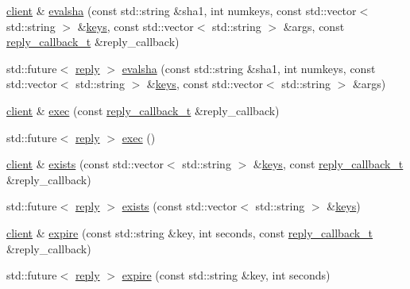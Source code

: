 \begin{DoxyCompactItemize}
\item 
\hyperlink{classcpp__redis_1_1client}{client} \& \hyperlink{classcpp__redis_1_1client_a71cd73130b4755c9f4da3b602b09a1be}{evalsha} (const std\+::string \&sha1, int numkeys, const std\+::vector$<$ std\+::string $>$ \&\hyperlink{classcpp__redis_1_1client_acb7845a206b2321e6919c2f38282c322}{keys}, const std\+::vector$<$ std\+::string $>$ \&args, const \hyperlink{classcpp__redis_1_1client_a061a1140d36d2eaeda82b09a0bb3f9f2}{reply\+\_\+callback\+\_\+t} \&reply\+\_\+callback)
\item 
std\+::future$<$ \hyperlink{classcpp__redis_1_1reply}{reply} $>$ \hyperlink{classcpp__redis_1_1client_a3ab7684f292037dc3918c32549b7ad53}{evalsha} (const std\+::string \&sha1, int numkeys, const std\+::vector$<$ std\+::string $>$ \&\hyperlink{classcpp__redis_1_1client_acb7845a206b2321e6919c2f38282c322}{keys}, const std\+::vector$<$ std\+::string $>$ \&args)
\item 
\hyperlink{classcpp__redis_1_1client}{client} \& \hyperlink{classcpp__redis_1_1client_a76e78829c4ee2e1484268e465fab8997}{exec} (const \hyperlink{classcpp__redis_1_1client_a061a1140d36d2eaeda82b09a0bb3f9f2}{reply\+\_\+callback\+\_\+t} \&reply\+\_\+callback)
\item 
std\+::future$<$ \hyperlink{classcpp__redis_1_1reply}{reply} $>$ \hyperlink{classcpp__redis_1_1client_a93c5b232ae13b5107b6aa1ea5f70b70d}{exec} ()
\item 
\hyperlink{classcpp__redis_1_1client}{client} \& \hyperlink{classcpp__redis_1_1client_a11836c341d54a9d767cd37508bf87d73}{exists} (const std\+::vector$<$ std\+::string $>$ \&\hyperlink{classcpp__redis_1_1client_acb7845a206b2321e6919c2f38282c322}{keys}, const \hyperlink{classcpp__redis_1_1client_a061a1140d36d2eaeda82b09a0bb3f9f2}{reply\+\_\+callback\+\_\+t} \&reply\+\_\+callback)
\item 
std\+::future$<$ \hyperlink{classcpp__redis_1_1reply}{reply} $>$ \hyperlink{classcpp__redis_1_1client_a16ab72e15bd14a3fd2eb97194cea3d2d}{exists} (const std\+::vector$<$ std\+::string $>$ \&\hyperlink{classcpp__redis_1_1client_acb7845a206b2321e6919c2f38282c322}{keys})
\item 
\hyperlink{classcpp__redis_1_1client}{client} \& \hyperlink{classcpp__redis_1_1client_ab2c50e9f37a4e6a5dff059c991dbd15e}{expire} (const std\+::string \&key, int seconds, const \hyperlink{classcpp__redis_1_1client_a061a1140d36d2eaeda82b09a0bb3f9f2}{reply\+\_\+callback\+\_\+t} \&reply\+\_\+callback)
\item 
std\+::future$<$ \hyperlink{classcpp__redis_1_1reply}{reply} $>$ \hyperlink{classcpp__redis_1_1client_aeb2f8b475d5adf23a25ae066e1ff45f4}{expire} (const std\+::string \&key, int seconds)

\end{DoxyCompactItemize}
